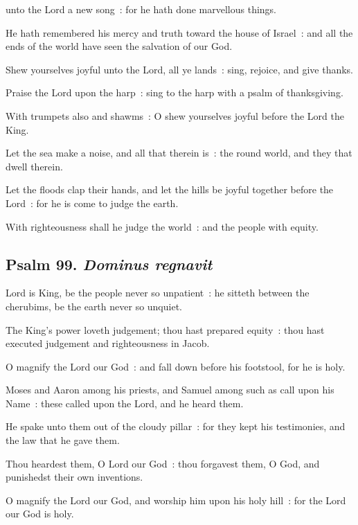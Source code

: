  unto the Lord a new song~: for he hath done marvellous things.\par
{}
He hath remembered his mercy and truth toward the house of Israel~: and all the ends of the world have seen the salvation of our God.\par
{}Shew yourselves joyful unto the Lord, all ye lands~: sing, rejoice, and give thanks.\par
{}Praise the Lord upon the harp~: sing to the harp with a psalm of thanksgiving.\par
{}With trumpets also and shawms~: O shew yourselves joyful before the Lord the King.\par
{}Let the sea make a noise, and all that therein is~: the round world, and they that dwell therein.\par
{}Let the floods clap their hands, and let the hills be joyful together before the Lord~: for he is come to judge the earth.\par
{}With righteousness shall he judge the world~: and the people with equity.\par

\subsection{Psalm 99. \textit{Dominus regnavit}}


 Lord is King, be the people never so unpatient~: he sitteth between the cherubims, be the earth never so unquiet.\par
{}
The King's power loveth judgement; thou hast prepared equity~: thou hast executed judgement and righteousness in Jacob.\par
{}O magnify the Lord our God~: and fall down before his footstool, for he is holy.\par
{}Moses and Aaron among his priests, and Samuel among such as call upon his Name~: these called upon the Lord, and he heard them.\par
{}He spake unto them out of the cloudy pillar~: for they kept his testimonies, and the law that he gave them.\par
{}Thou heardest them, O Lord our God~: thou forgavest them, O God, and punishedst their own inventions.\par
{}O magnify the Lord our God, and worship him upon his holy hill~: for the Lord our God is holy.\par

